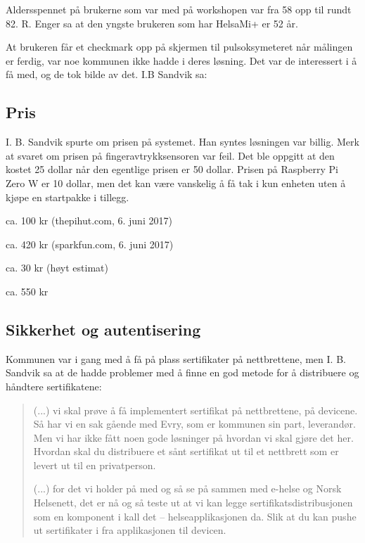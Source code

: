 Aldersspennet på brukerne som var med på workshopen var fra 58 opp til rundt 82. R. Enger sa at den yngste brukeren som har HelsaMi+ er 52 år.

At brukeren får et checkmark opp på skjermen til pulsoksymeteret når målingen er ferdig, var noe kommunen ikke hadde i deres løsning. Det var
de interessert i å få med, og de tok bilde av det. I.B Sandvik sa: 

\subsection{Pris}
I. B. Sandvik spurte om prisen på systemet. Han syntes løsningen var billig. Merk at svaret om prisen på fingeravtrykksensoren var feil.
Det ble oppgitt at den kostet 25 dollar når den egentlige prisen er 50 dollar. Prisen på Raspberry Pi Zero W er 10 dollar, men det kan
være vanskelig å få tak i kun enheten uten å kjøpe en startpakke i tillegg.

\begin{description}[leftmargin=!,labelwidth=\widthof{\bfseries Knapp, lysdioder, annet}]
    \item[Raspberry Pi Zero W:] ca. 100 kr (thepihut.com, 6. juni 2017)
    \item[GT511-C3:] ca. 420 kr (sparkfun.com, 6. juni 2017)
    \item[Knapp, lysdioder, annet:] ca. 30 kr (høyt estimat)
    \item[Totalsum:] ca. 550 kr
\end{description}

\subsection{Sikkerhet og autentisering}
Kommunen var i gang med å få på plass sertifikater på nettbrettene, men I. B. Sandvik sa at de hadde problemer med å finne en god metode
for å distribuere og håndtere sertifikatene:
\blockquote{(...) vi skal prøve å få implementert sertifikat på nettbrettene, på devicene. Så har vi en sak gående med Evry, som er kommunen sin part, leverandør.
    Men vi har
    ikke fått noen gode løsninger på hvordan vi skal gjøre det her. Hvordan skal du distribuere et sånt sertifikat ut til et nettbrett som er levert ut til en
    privatperson.

(...) for det vi holder på med og så se på sammen med e-helse og Norsk Helsenett, det er nå og så teste ut at vi kan legge
sertifikatsdistribusjonen som en komponent i
kall det -- helseapplikasjonen da. Slik at du kan pushe ut sertifikater i fra applikasjonen til devicen.}

